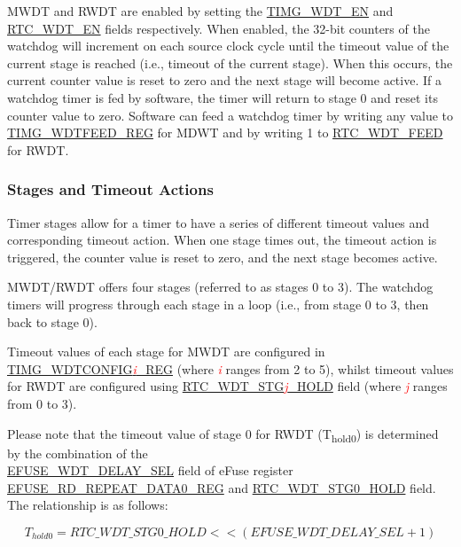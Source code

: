 \documentclass[main\_\_EN.tex]{subfiles}
\begin{document}
MWDT and RWDT are enabled by setting the \hyperref[fielddesc:TIMGWDTEN]{TIMG\_WDT\_EN} and  \hyperref[fielddesc:RTCWDTEN]{RTC\_WDT\_EN} fields respectively. When enabled, the 32-bit counters of the watchdog will increment on each source clock cycle until the timeout value of the current stage is reached (i.e., timeout of the current stage). When this occurs, the current counter value is reset to zero and the next stage will become active. If a watchdog timer is fed by software, the timer will return to stage 0 and reset its counter value to zero. Software can feed a watchdog timer by writing any value to \hyperref[regdesc:TIMGWDTFEEDREG]{TIMG\_WDTFEED\_REG} for MDWT and by writing 1 to \hyperref[fielddesc:RTCWDTFEED]{RTC\_WDT\_FEED} for RWDT.


\subsubsection{Stages and Timeout Actions}\label{sec:wdt-timeout}

Timer stages allow for a timer to have a series of different timeout values and corresponding timeout action. When one stage times out, the timeout action is triggered, the counter value is reset to zero, and the next stage becomes active.

MWDT/RWDT offers four stages (referred to as stages 0 to 3). The watchdog timers will progress through each stage in a loop (i.e., from stage 0 to 3, then back to stage 0).

Timeout values of each stage for MWDT are configured in \hyperref[regdesc:TIMGWDTCONFIG2REG]{TIMG\_WDTCONFIG\textcolor{red}{\it{i}}\_REG} (where \textcolor{red}{\it{i}} ranges from 2 to 5), whilst timeout values for RWDT are configured using \hyperref[fielddesc:RTCWDTSTG3HOLD]{RTC\_WDT\_STG\textcolor{red}{\it{j}}\_HOLD} field (where \textcolor{red}{\it{j}} ranges from 0 to 3).

Please note that the timeout value of stage 0 for RWDT (T\textsubscript{hold0}) is determined by the combination of the \\ \hyperref[fielddesc:EFUSEWDTDELAYSEL]{EFUSE\_WDT\_DELAY\_SEL} field of eFuse register \hyperref[regdesc:EFUSERDREPEATDATA0REG]{EFUSE\_RD\_REPEAT\_DATA0\_REG} and  \hyperref[fielddesc:RTCWDTSTG0HOLD]{RTC\_WDT\_STG0\_HOLD} field. The relationship is as follows:

\begin{displaymath}
T_{hold0} = \hyperref[fielddesc:RTCWDTSTG0HOLD]{RTC\_WDT\_STG0\_HOLD}   << (\hyperref[fielddesc:EFUSEWDTDELAYSEL]{EFUSE\_WDT\_DELAY\_SEL} + 1)
\end{displaymath}
\end{document}
